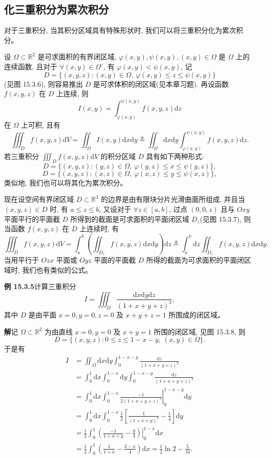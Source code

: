 \documentclass[UTF8,12pt,a4paper,fontset=fandol]{ctexart}
\begin{document}
\subsection{化三重积分为累次积分}

对于三重积分, 当其积分区域具有特殊形状时, 我们可以将三重积分化为累次积分。

设 $\Omega\subset\mathbb R^2$ 是可求面积的有界闭区域, $\varphi(x,y),\psi(x,y),(x,y)\in\Omega$ 是 $\Omega$ 上的连续函数, 且对于 $\forall(x,y)\in\Omega^\circ$, 有 $\varphi(x,y)<\psi(x,y)$, 记
\[
  D=\{(x,y,z):(x,y)\in\Omega,\ \varphi(x,y)\leqslant z\leqslant\psi(x,y)\}
\]
(见图 15.3.6), 则容易推出 $D$ 是可求体积的闭区域(见本章习题). 再设函数 $f(x,y,z)$ 在 $D$ 上连续, 则
\[
  I(x,y)=\int_{\varphi(x,y)}^{\psi(x,y)}f(x,y,z)\mathrm dz
\]
在 $\Omega$ 上可积, 且有
\[
  \iiint_D f(x,y,z)\mathrm dV
  =\iint_\Omega I(x,y)\mathrm dx\mathrm dy
  \triangleq \iint_\Omega\mathrm dx\mathrm dy
    \int_{\varphi(x,y)}^{\psi(x,y)}f(x,y,z)\mathrm dz.
\]
若三重积分 $\iiint_D f(x,y,z)\mathrm dV$ 的积分区域 $D$ 具有如下两种形式:
\[
  D=\{(x,y,z):(y,z)\in\Omega,\ \varphi(y,z)\leqslant x\leqslant\psi(y,z)\},
\]
\[
  D=\{(x,y,z):(x,z)\in\Omega,\ \varphi(x,z)\leqslant y\leqslant\psi(x,z)\},
\]
类似地, 我们也可以将其化为累次积分。

现在设空间有界闭区域 $D\subset\mathbb R^3$ 的边界是由有限块分片光滑曲面所组成, 并且当 $(x,y,z)\in D$ 时, 有 $a\leqslant z\leqslant b$, 又设对于 $\forall z\in[a,b]$, 过点 $(0,0,z)$ 且与 $Oxy$ 平面平行的平面截 $D$ 所得到的截面是可求面积的平面闭区域 $D_z$(见图 15.3.7), 则当函数 $f(x,y,z)$ 在 $D$ 上连续时, 有
\[
  \iiint_D f(x,y,z)\mathrm dV
  =\int_a^b\left(\iint_{D_z}f(x,y,z)\mathrm dx\mathrm dy\right)\mathrm dz
  \triangleq \int_a^b\mathrm dz\iint_{D_z}f(x,y,z)\mathrm dx\mathrm dy.
\]
当用平行于 $Ozx$ 平面或 $Oyz$ 平面的平面截 $D$ 所得的截面为可求面积的平面闭区域时, 我们也有类似的公式。

\noindent\textbf{例 15.3.5}\quad 计算三重积分
\[
  I=\iiint_D\frac{\mathrm dx\mathrm dy\mathrm dz}{(1+x+y+z)^3},
\]
其中 $D$ 是由平面 $x=0,y=0,z=0$ 及 $x+y+z=1$ 所围成的闭区域。

\noindent\textbf{解}\quad 记 $\Omega\subset\mathbb R^2$ 为由直线 $x=0,y=0$ 及 $x+y=1$ 所围的闭区域, 见图 15.3.8, 则
\[
  D=\{(x,y,z):0\leqslant z\leqslant1-x-y,\ (x,y)\in\Omega\}.
\]
于是有
\[
\begin{aligned}
  I
  &=\iint_\Omega\mathrm dx\mathrm dy\int_0^{1-x-y}\frac{\mathrm dz}{(1+x+y+z)^3}\\
  &=\int_0^1\mathrm dx\int_0^{1-x}\mathrm dy\int_0^{1-x-y}\frac{\mathrm dz}{(1+x+y+z)^3}\\
  &=\int_0^1\mathrm dx\int_0^{1-x}
    \left.\frac{-1}{2(1+x+y+z)^2}\right|_0^{1-x-y}\mathrm dy\\
  &=\int_0^1\mathrm dx\int_0^{1-x}\frac12\left[\frac1{(1+x+y)^2}-\frac14\right]\mathrm dy\\
  &=\frac12\int_0^1\left.\left(\frac{-1}{1+x+y}-\frac y4\right)\right|_0^{1-x}\mathrm dx\\
  &=\frac12\int_0^1\left(\frac1{1+x}-\frac{3-x}{4}\right)\mathrm dx
    =\frac12\ln2-\frac5{16}.
\end{aligned}
\]
\end{document}
